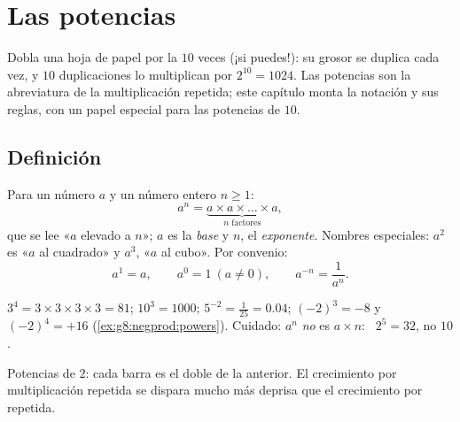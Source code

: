 \chapter{Las potencias}\label{ch:g8:powers}

Dobla una hoja de papel por la  $10$ veces (¡si puedes!): su grosor
se duplica cada vez, y $10$ duplicaciones lo multiplican por
$2^{10} = 1024$. Las potencias son la abreviatura de la multiplicación repetida;
este capítulo monta la notación y sus reglas, con un papel especial
para las potencias de $10$.

\section{Definición}

\begin{definition}[Potencia]\label{def:g8:powers:def}
Para un número $a$ y un número entero $n \geq 1$:
\[
a^n = \underbrace{a \times a \times \dots \times a}_{n
\text{ factores}},
\]
que se lee «$a$ elevado a $n$»; $a$ es la \emph{base} y $n$, el
\emph{exponente}. Nombres especiales: $a^2$ es «$a$ al
cuadrado» y $a^3$, «$a$ al cubo». Por convenio:
\[
a^1 = a,
\qquad
a^0 = 1 \ (a \neq 0),
\qquad
a^{-n} = \frac{1}{a^n}.
\]
\end{definition}

\begin{example}\label{ex:g8:powers:def}
$3^4 = 3 \times 3 \times 3 \times 3 = 81$; \quad
$10^3 = 1000$; \quad $5^{-2} = \frac{1}{25} = 0.04$; \quad
$(-2)^3 = -8$ y $(-2)^4 = +16$
(\cref{ex:g8:negprod:powers}). Cuidado: $a^n$ \emph{no} es
$a \times n$: \ $2^5 = 32$, no $10$.
\end{example}

\begin{omfigure}

{\small Potencias de $2$: cada barra es el doble de la anterior. El crecimiento por
multiplicación repetida se dispara mucho más deprisa que el crecimiento por
 repetida.}
\end{omfigure}

